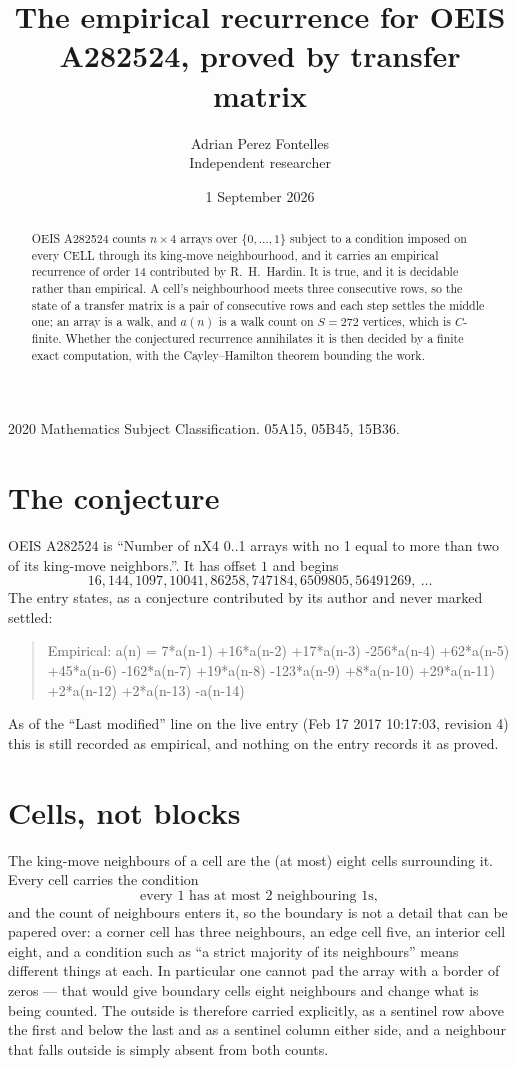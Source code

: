 \documentclass[11pt,a4paper]{article}
\title{The empirical recurrence for OEIS A282524, proved by transfer matrix}
\author{Adrian Perez Fontelles\\ \small Independent researcher}
\date{1 September 2026}
\theoremstyle{plain}
\theoremstyle{definition}
\begin{document}
\maketitle

\begin{abstract}
OEIS A282524 counts $n\times4$ arrays over $\{0,\dots,1\}$ subject to a condition imposed on
every CELL through its king-move neighbourhood, and it carries an empirical recurrence of
order $14$ contributed by R.~H.~Hardin. It is true, and it is decidable rather than
empirical. A cell's neighbourhood meets three consecutive rows, so the state of a transfer
matrix is a pair of consecutive rows and each step settles the middle one; an array is a
walk, and $a(n)$ is a walk count on $S=272$ vertices, which is $C$-finite. Whether the
conjectured recurrence annihilates it is then decided by a finite exact computation, with the
Cayley--Hamilton theorem bounding the work.
\end{abstract}

\noindent\small 2020 Mathematics Subject Classification. 05A15, 05B45, 15B36.\normalsize

\section{The conjecture}

OEIS A282524 is ``Number of nX4 0..1 arrays with no 1 equal to more than two of its king-move neighbors.''. It has offset $1$ and begins
\[
16, 144, 1097, 10041, 86258, 747184, 6509805, 56491269,\ \dots
\]
The entry states, as a conjecture contributed by its author and never marked settled:
\begin{quote}
Empirical: a(n) = 7*a(n-1) +16*a(n-2) +17*a(n-3) -256*a(n-4) +62*a(n-5) +45*a(n-6) -162*a(n-7) +19*a(n-8) -123*a(n-9) +8*a(n-10) +29*a(n-11) +2*a(n-12) +2*a(n-13) -a(n-14)
\end{quote}
As of the ``Last modified'' line on the live entry (Feb 17 2017 10:17:03, revision 4) this is still
recorded as empirical, and nothing on the entry records it as proved.

\section{Cells, not blocks}

The king-move neighbours of a cell are the (at most) eight cells surrounding it. Every cell
carries the condition
\[
\text{every }1\text{ has at most }2\text{ neighbouring }1\text{s},
\]
and the count of neighbours enters it, so the boundary is not a detail that can be papered
over: a corner cell has three neighbours, an edge cell five, an interior cell eight, and a
condition such as ``a strict majority of its neighbours'' means different things at each. In
particular one cannot pad the array with a border of zeros --- that would give boundary cells
eight neighbours and change what is being counted. The outside is therefore carried
explicitly, as a sentinel row above the first and below the last and as a sentinel column
either side, and a neighbour that falls outside is simply absent from both counts.
\end{document}
